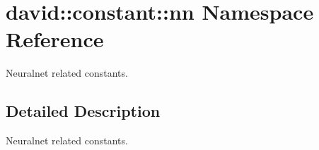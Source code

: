 \hypertarget{namespacedavid_1_1constant_1_1nn}{}\section{david\+:\+:constant\+:\+:nn Namespace Reference}
\label{namespacedavid_1_1constant_1_1nn}


Neuralnet related constants.  




\subsection{Detailed Description}
Neuralnet related constants. 